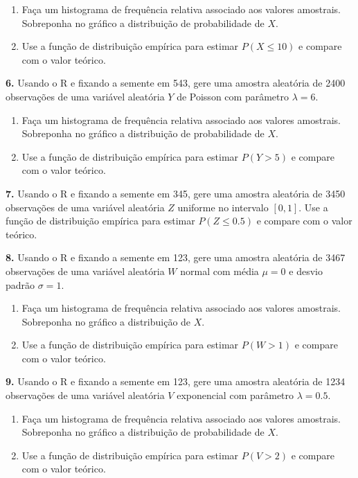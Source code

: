 \documentclass[
]{book}
\begin{document}
\begin{enumerate}
\def\labelenumi{(\alph{enumi})}
\item
  Faça um histograma de frequência relativa associado aos valores
  amostrais. Sobreponha no gráfico a distribuição de probabilidade de \(X\).
\item
  Use a função de distribuição empírica para estimar \(P(X\leq 10)\)
  e compare com o valor teórico.
\end{enumerate}

\textbf{6.} Usando o R e fixando a semente em 543, gere uma amostra aleatória
de 2400 observações de uma variável aleatória \(Y\) de Poisson com
parâmetro \(\lambda = 6\).

\begin{enumerate}
\def\labelenumi{(\alph{enumi})}
\item
  Faça um histograma de frequência relativa associado aos valores
  amostrais. Sobreponha no gráfico a distribuição de probabilidade de \(X\).
\item
  Use a função de distribuição empírica para estimar \(P(Y > 5)\) e
  compare com o valor teórico.
\end{enumerate}

\textbf{7.} Usando o R e fixando a semente em 345, gere uma amostra aleatória
de 3450 observações de uma variável aleatória \(Z\) uniforme no intervalo
\([0, 1]\). Use a função de distribuição empírica para estimar
\(P(Z \leq 0.5)\) e compare com o valor teórico.

\textbf{8.} Usando o R e fixando a semente em 123, gere uma amostra aleatória
de 3467 observações de uma variável aleatória \(W\) normal com média
\(\mu = 0\) e desvio padrão \(\sigma = 1\).

\begin{enumerate}
\def\labelenumi{(\alph{enumi})}
\item
  Faça um histograma de frequência relativa associado aos valores
  amostrais. Sobreponha no gráfico a distribuição de \(X\).
\item
  Use a função de distribuição empírica para estimar \(P(W > 1)\) e
  compare com o valor teórico.
\end{enumerate}

\textbf{9.} Usando o R e fixando a semente em 123, gere uma amostra aleatória
de 1234 observações de uma variável aleatória \(V\) exponencial com
parâmetro \(\lambda = 0.5\).

\begin{enumerate}
\def\labelenumi{(\alph{enumi})}
\item
  Faça um histograma de frequência relativa associado aos valores
  amostrais. Sobreponha no gráfico a distribuição de probabilidade de \(X\).
\item
  Use a função de distribuição empírica para estimar \(P(V > 2)\) e
  compare com o valor teórico.
\end{enumerate}
\end{document}
